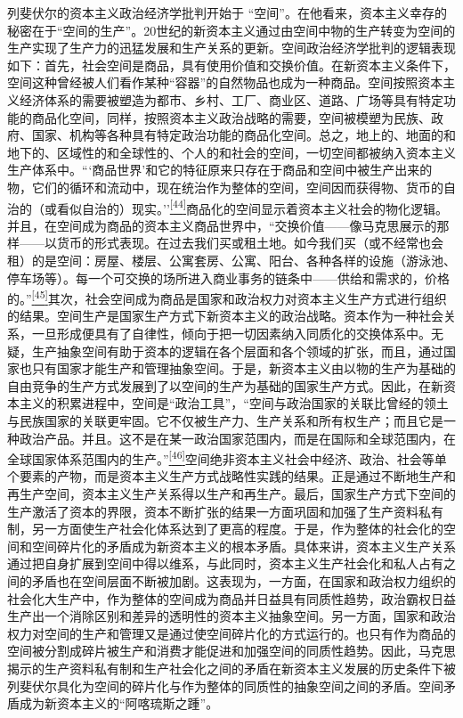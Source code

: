 \documentclass[UTF8, fontset = sourcesans, a4paper, oneside, zihao =
-4, scheme=chinese, no-math, space=true]{ctexbook}
\begin{document}
列斐伏尔的资本主义政治经济学批判开始于
``空间''。在他看来，资本主义幸存的秘密在于``空间的生产''。20世纪的新资本主义通过由空间中物的生产转变为空间的生产实现了生产力的迅猛发展和生产关系的更新。空间政治经济学批判的逻辑表现如下：首先，社会空间是商品，具有使用价值和交换价值。在新资本主义条件下，空间这种曾经被人们看作某种``容器''的自然物品也成为一种商品。空间按照资本主义经济体系的需要被塑造为都市、乡村、工厂、商业区、道路、广场等具有特定功能的商品化空间，同样，按照资本主义政治战略的需要，空间被模塑为民族、政府、国家、机构等各种具有特定政治功能的商品化空间。总之，地上的、地面的和地下的、区域性的和全球性的、个人的和社会的空间，一切空间都被纳入资本主义生产体系中。```商品世界'和它的特征原来只存在于商品和空间中被生产出来的物，它们的循环和流动中，现在统治作为整体的空间，空间因而获得物、货币的自治的（或看似自治的）现实。''\protect\hypertarget{part0010_split_002.htmlux5cux23w44}{}{}\protect\hyperlink{part0010_split_002.htmlux5cux23m44}{\textsuperscript{{[}44{]}}}商品化的空间显示着资本主义社会的物化逻辑。并且，在空间成为商品的资本主义商品世界中，``交换价值------像马克思展示的那样------以货币的形式表现。在过去我们买或租土地。如今我们买（或不经常也会租）的是空间：房屋、楼层、公寓套房、公寓、阳台、各种各样的设施（游泳池、停车场等）。每一个可交换的场所进入商业事务的链条中------供给和需求的，价格的。''\protect\hypertarget{part0010_split_002.htmlux5cux23w45}{}{}\protect\hyperlink{part0010_split_002.htmlux5cux23m45}{\textsuperscript{{[}45{]}}}其次，社会空间成为商品是国家和政治权力对资本主义生产方式进行组织的结果。空间生产是国家生产方式下新资本主义的政治战略。资本作为一种社会关系，一旦形成便具有了自律性，倾向于把一切因素纳入同质化的交换体系中。无疑，生产抽象空间有助于资本的逻辑在各个层面和各个领域的扩张，而且，通过国家也只有国家才能生产和管理抽象空间。于是，新资本主义由以物的生产为基础的自由竞争的生产方式发展到了以空间的生产为基础的国家生产方式。因此，在新资本主义的积累进程中，空间是``政治工具''，``空间与政治国家的关联比曾经的领土与民族国家的关联更牢固。它不仅被生产力、生产关系和所有权生产；而且它是一种政治产品。并且。这不是在某一政治国家范围内，而是在国际和全球范围内，在全球国家体系范围内的生产。''\protect\hypertarget{part0010_split_002.htmlux5cux23w46}{}{}\protect\hyperlink{part0010_split_002.htmlux5cux23m46}{\textsuperscript{{[}46{]}}}空间绝非资本主义社会中经济、政治、社会等单个要素的产物，而是资本主义生产方式战略性实践的结果。正是通过不断地生产和再生产空间，资本主义生产关系得以生产和再生产。最后，国家生产方式下空间的生产激活了资本的界限，资本不断扩张的结果一方面巩固和加强了生产资料私有制，另一方面使生产社会化体系达到了更高的程度。于是，作为整体的社会化的空间和空间碎片化的矛盾成为新资本主义的根本矛盾。具体来讲，资本主义生产关系通过把自身扩展到空间中得以维系，与此同时，资本主义生产社会化和私人占有之间的矛盾也在空间层面不断被加剧。这表现为，一方面，在国家和政治权力组织的社会化大生产中，作为整体的空间成为商品并日益具有同质性趋势，政治霸权日益生产出一个消除区别和差异的透明性的资本主义抽象空间。另一方面，国家和政治权力对空间的生产和管理又是通过使空间碎片化的方式运行的。也只有作为商品的空间被分割成碎片被生产和消费才能促进和加强空间的同质性趋势。因此，马克思揭示的生产资料私有制和生产社会化之间的矛盾在新资本主义发展的历史条件下被列斐伏尔具化为空间的碎片化与作为整体的同质性的抽象空间之间的矛盾。空间矛盾成为新资本主义的``阿喀琉斯之踵''。
\end{document}
